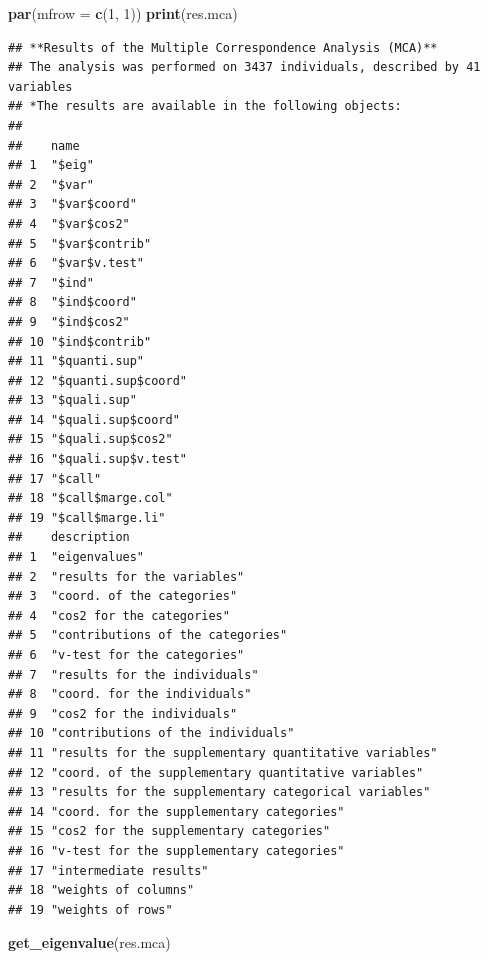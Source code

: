 \documentclass[11pt,]{article}
\newenvironment{Shaded}{\begin{snugshade}}{\end{snugshade}}
\newcommand{\DataTypeTok}[1]{\textcolor[rgb]{0.13,0.29,0.53}{#1}}
\newcommand{\DecValTok}[1]{\textcolor[rgb]{0.00,0.00,0.81}{#1}}
\newcommand{\KeywordTok}[1]{\textcolor[rgb]{0.13,0.29,0.53}{\textbf{#1}}}
\newcommand{\NormalTok}[1]{#1}
\begin{document}
\begin{Shaded}
\begin{Highlighting}[]
\KeywordTok{par}\NormalTok{(}\DataTypeTok{mfrow =} \KeywordTok{c}\NormalTok{(}\DecValTok{1}\NormalTok{, }\DecValTok{1}\NormalTok{))}
\KeywordTok{print}\NormalTok{(res.mca)}
\end{Highlighting}
\end{Shaded}

\begin{verbatim}
## **Results of the Multiple Correspondence Analysis (MCA)**
## The analysis was performed on 3437 individuals, described by 41 variables
## *The results are available in the following objects:
## 
##    name               
## 1  "$eig"             
## 2  "$var"             
## 3  "$var$coord"       
## 4  "$var$cos2"        
## 5  "$var$contrib"     
## 6  "$var$v.test"      
## 7  "$ind"             
## 8  "$ind$coord"       
## 9  "$ind$cos2"        
## 10 "$ind$contrib"     
## 11 "$quanti.sup"      
## 12 "$quanti.sup$coord"
## 13 "$quali.sup"       
## 14 "$quali.sup$coord" 
## 15 "$quali.sup$cos2"  
## 16 "$quali.sup$v.test"
## 17 "$call"            
## 18 "$call$marge.col"  
## 19 "$call$marge.li"   
##    description                                           
## 1  "eigenvalues"                                         
## 2  "results for the variables"                           
## 3  "coord. of the categories"                            
## 4  "cos2 for the categories"                             
## 5  "contributions of the categories"                     
## 6  "v-test for the categories"                           
## 7  "results for the individuals"                         
## 8  "coord. for the individuals"                          
## 9  "cos2 for the individuals"                            
## 10 "contributions of the individuals"                    
## 11 "results for the supplementary quantitative variables"
## 12 "coord. of the supplementary quantitative variables"  
## 13 "results for the supplementary categorical variables" 
## 14 "coord. for the supplementary categories"             
## 15 "cos2 for the supplementary categories"               
## 16 "v-test for the supplementary categories"             
## 17 "intermediate results"                                
## 18 "weights of columns"                                  
## 19 "weights of rows"
\end{verbatim}

\begin{Shaded}
\begin{Highlighting}[]
\KeywordTok{get_eigenvalue}\NormalTok{(res.mca)}
\end{Highlighting}
\end{Shaded}
\end{document}
